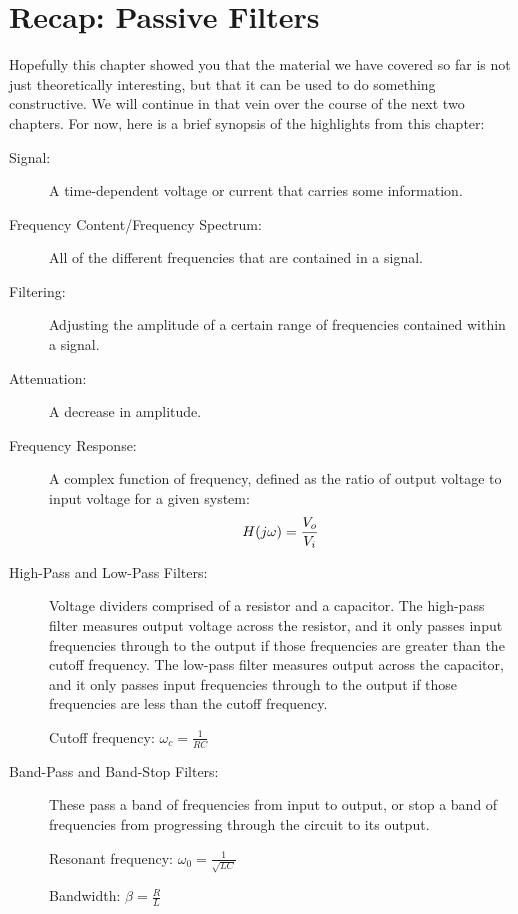 \section{Recap: Passive Filters}
Hopefully this chapter showed you that the material we have covered so far is not just theoretically interesting, but that it can be used to do something constructive. We will continue in that vein over the course of the next two chapters. For now, here is a brief synopsis of the highlights from this chapter:
\begin{description}
\item[Signal:] A time-dependent voltage or current that carries some information.
\item[Frequency Content/Frequency Spectrum:] All of the different frequencies that are contained in a signal.
\item[Filtering:] Adjusting the amplitude of a certain range of frequencies contained within a signal.
\item[Attenuation:] A decrease in amplitude. 
\item[Frequency Response:] A complex function of frequency, defined as the ratio of output voltage to input voltage for a given system:
$$
\mathnormal{H(j\omega)} = \frac{V_o}{V_i}
$$
\item[High-Pass and Low-Pass Filters:] Voltage dividers comprised of a resistor and a capacitor. The high-pass filter measures output voltage across the resistor, and it only passes input frequencies through to the output if those frequencies are greater than the cutoff frequency. The low-pass filter measures output across the capacitor, and it only passes input frequencies through to the output if those frequencies are less than the cutoff frequency.
\par
Cutoff frequency: $\omega_c = \frac{1}{RC}$
\item[Band-Pass and Band-Stop Filters:] These pass a band of frequencies from input to output, or stop a band of frequencies from progressing through the circuit to its output.
\par
Resonant frequency:  $\omega_0 = \frac{1}{\sqrt{LC}}$
\par
Bandwidth:  $\beta = \frac{R}{L}$
\end{description}